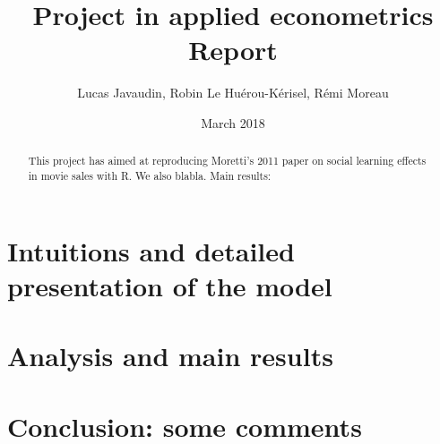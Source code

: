 \documentclass{article}
\title{Project in applied econometrics\\ Report}
\author{Lucas Javaudin, Robin Le Huérou-Kérisel, Rémi Moreau}
\date{March 2018}
\begin{document}
\maketitle

%
%
%
%
%
\begin{abstract}
	This project has aimed at reproducing Moretti's 2011 paper on social learning effects in movie sales with R. We also blabla. Main results:
\end{abstract}
\tableofcontents
\pagebreak
\section{Intuitions and detailed presentation of the model}


\pagebreak
\section{Analysis and main results}



\pagebreak

\pagebreak
\section{Conclusion: some comments}
\end{document}
